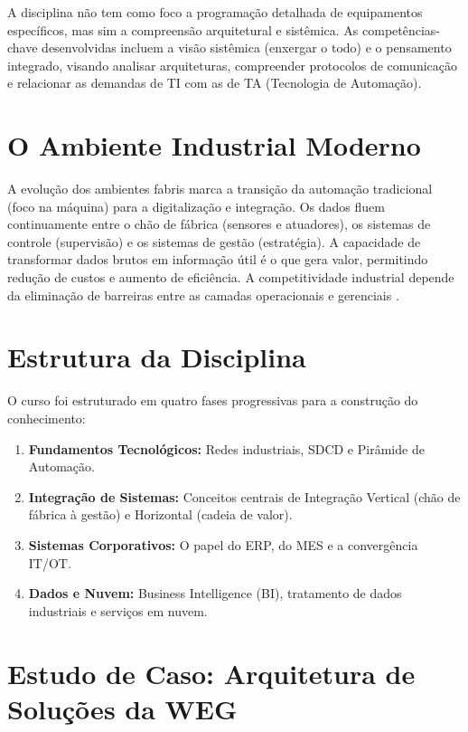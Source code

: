 \documentclass[12pt,a4paper,oneside]{article}
\begin{document}
A disciplina não tem como foco a programação detalhada de equipamentos específicos, mas sim a compreensão arquitetural e sistêmica. As competências-chave desenvolvidas incluem a visão sistêmica (enxergar o todo) e o pensamento integrado, visando analisar arquiteturas, compreender protocolos de comunicação e relacionar as demandas de TI com as de TA (Tecnologia de Automação).

\section{O Ambiente Industrial Moderno}

A evolução dos ambientes fabris marca a transição da automação tradicional (foco na máquina) para a digitalização e integração. Os dados fluem continuamente entre o chão de fábrica (sensores e atuadores), os sistemas de controle (supervisão) e os sistemas de gestão (estratégia). A capacidade de transformar dados brutos em informação útil é o que gera valor, permitindo redução de custos e aumento de eficiência. A competitividade industrial depende da eliminação de barreiras entre as camadas operacionais e gerenciais \cite{moraes2007}.

\section{Estrutura da Disciplina}

O curso foi estruturado em quatro fases progressivas para a construção do conhecimento:

\begin{enumerate}
  \item \textbf{Fundamentos Tecnológicos:} Redes industriais, SDCD e Pirâmide de Automação.
  \item \textbf{Integração de Sistemas:} Conceitos centrais de Integração Vertical (chão de fábrica à gestão) e Horizontal (cadeia de valor).
  \item \textbf{Sistemas Corporativos:} O papel do ERP, do MES e a convergência IT/OT.
  \item \textbf{Dados e Nuvem:} Business Intelligence (BI), tratamento de dados industriais e serviços em nuvem.
\end{enumerate}

\section{Estudo de Caso: Arquitetura de Soluções da WEG}
\end{document}
